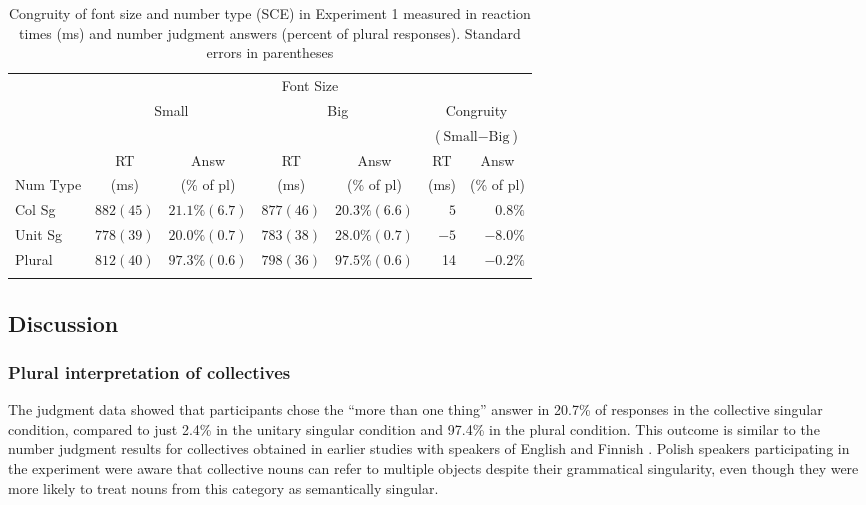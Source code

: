 \documentclass[output=paper]{langscibook}
\begin{document}
\begin{table}[]
\caption{Congruity of font size and number type (SCE) in Experiment 1 measured in reaction times (ms) and number judgment answers (percent of plural responses). Standard errors in parentheses}
\label{gul-bla:tab:SCE-exp1}
\begin{tabular}{l rr rr rr}
\lsptoprule
&\multicolumn{6}{c}{Font Size}\\\cmidrule(lr){2-7}
&\multicolumn{2}{c}{\multirow{2}{*}{Small}}&\multicolumn{2}{c}{\multirow{2}{*}{Big}}&\multicolumn{2}{c}{Congruity}\\
&&&&&\multicolumn{2}{c}{($\text{Small}-\text{Big}$)}\\\cmidrule(lr){2-3}\cmidrule(lr){4-5}\cmidrule(lr){6-7}
&\multicolumn{1}{c}{RT}&\multicolumn{1}{c}{Answ}&\multicolumn{1}{c}{RT}&\multicolumn{1}{c}{Answ}&\multicolumn{1}{c}{RT}&\multicolumn{1}{c}{Answ}\\
Num Type&\multicolumn{1}{c}{(ms)}&\multicolumn{1}{c}{(\% of pl)}&\multicolumn{1}{c}{(ms)}&\multicolumn{1}{c}{(\% of pl)}&\multicolumn{1}{c}{(ms)}&\multicolumn{1}{c}{(\% of pl)}\\\midrule
Col Sg  & $882 (45)$ & $21.1\% (6.7)$ & $877 (46)$ & $20.3\% (6.6)$ & $5$  & $0.8\%$  \\
Unit Sg & $778 (39)$ & $20.0\% (0.7)$ & $783 (38)$ & $28.0\% (0.7)$ & $-5$ & $-8.0\%$ \\
Plural  & $812 (40)$ & $97.3\% (0.6)$ & $798 (36)$ & $97.5\% (0.6)$ & 14 & $-0.2\%$ \\
\lspbottomrule
\end{tabular}
\end{table}


\subsection{Discussion}

\subsubsection{Plural interpretation of collectives}
The judgment data showed that participants chose the “more than one thing” answer in 20.7\% of responses in the collective singular condition, compared to just 2.4\% in the unitary singular condition and 97.4\% in the plural condition. This outcome is similar to the number judgment results for collectives obtained in earlier studies with speakers of English \citep{bockMeaningSoundSyntax1993} and Finnish \citep{nenonenMismatchesGrammaticalNumber2010}. Polish speakers participating in the experiment were aware that collective nouns can refer to multiple objects despite their grammatical singularity, even though they were more likely to treat nouns from this category as semantically singular. 
\end{document}

